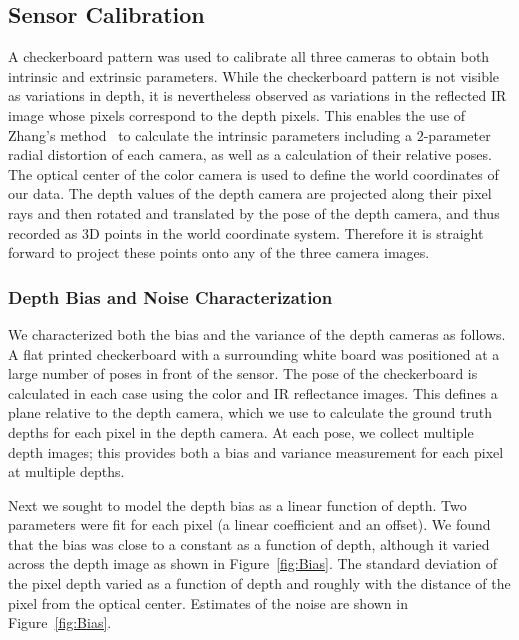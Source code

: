 

\subsection{Sensor Calibration}

A checkerboard pattern was used to calibrate all three cameras to obtain both intrinsic and extrinsic parameters.  While the checkerboard pattern is not visible as variations in depth, it is nevertheless observed as variations in the reflected IR image whose pixels correspond to the depth pixels.  This enables the use of Zhang's method~\cite{Zhang2000} to calculate the intrinsic parameters including a $2$-parameter radial distortion of each camera, as well as a calculation of their relative poses.  The optical center of the color camera is used to define the world coordinates of our data.  The depth values of the depth camera are projected along their pixel rays and then rotated and translated by the pose of the depth camera, and thus recorded as $3$D points in the world coordinate system.   
Therefore it is straight forward to project these points onto any of the three camera images.



\subsubsection{Depth Bias and Noise Characterization}
\label{sec:bias}

We characterized both the bias and the variance of the depth cameras as follows.  
A flat printed checkerboard with a surrounding white board was positioned at a large number of poses in front of the sensor.  
The pose of the checkerboard is calculated in each case using the color and IR reflectance images.  
This defines a plane relative to the depth camera, which we use to calculate the ground truth depths for each pixel in the depth camera.  
At each pose, we collect multiple depth images; this provides both a bias and variance measurement for each pixel at multiple depths.

Next we sought to model the depth bias as a linear function of depth.  
Two parameters were fit for each pixel (a linear coefficient and an offset).  
We found that the bias was close to a constant as a function of depth, although it varied across the depth image as shown in Figure~\ref{fig:Bias}.  
The standard deviation of the pixel depth varied as a function of depth and roughly with the distance of the pixel from the optical center.  
Estimates of the noise are shown in Figure~\ref{fig:Bias}.


